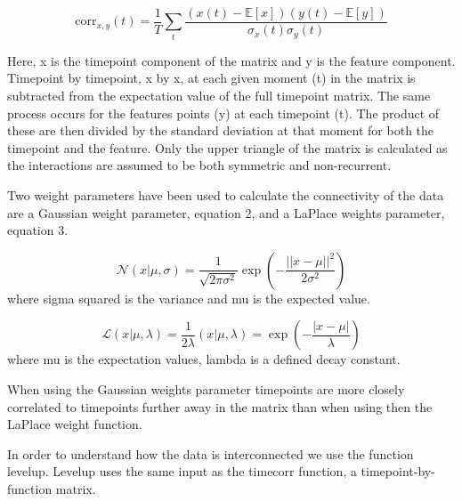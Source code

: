 \begin{equation}
\mathrm{corr}_{x,y}(t) = \frac{1}{T} \sum_{t} \frac{\left(x(t)-\mathbb{E}[x]\right)\left(y(t)-\mathbb{E}[y]\right)}{\sigma_{x}(t)\sigma_{y}(t)}
\end{equation}

Here, x is the timepoint component of the matrix and y is the feature component. Timepoint by timepoint, x by x, at each given moment (t) in the matrix is subtracted from the expectation value of the full timepoint matrix. The same process occurs for the features points (y) at each timepoint (t). The product of these are then divided by the standard deviation at that moment for both the timepoint and the feature. Only the upper triangle of the matrix is calculated as the interactions are assumed to be both symmetric and non-recurrent. 

Two weight parameters have been used to calculate the connectivity of the data are a Gaussian weight parameter, equation 2, and a LaPlace weights parameter, equation 3. 

\begin{equation}
\mathcal{N}\left( x | \mu, \sigma \right) = \frac{1}{\sqrt{2\pi\sigma^2}}\exp\left(-\frac{|| x - \mu ||^2}{2\sigma^2}\right)
\end{equation}
where sigma squared is the variance and mu is the expected value. 

\begin{equation}
\mathcal{L}\left( x | \mu, \lambda \right) = \frac{1}{2 \lambda}\left( x | \mu, \lambda \right) = \exp\left(-\frac{|x - \mu|}{\lambda}\right)
\end{equation}
where mu is the expectation values, lambda is a defined decay constant. 


When using the Gaussian weights parameter timepoints are more closely correlated to timepoints further away in the matrix than when using then the LaPlace weight function.


In order to understand how the data is interconnected we use the function levelup. Levelup uses the same input as the timecorr function, a timepoint-by-function matrix. 

